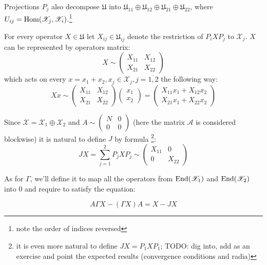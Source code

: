 \documentclass{article}
\begin{document}
Projections \( P_j \) also decompose \( \mathfrak U \) into
\( \mathfrak U_{11} \oplus \mathfrak U_{12} \oplus \mathfrak U_{21} \oplus \mathfrak U_{22} \),
where \( U_{ij} = \mathrm{Hom}({\mathscr X_j},{\mathscr X_i}) \).\footnote{note the order of indices reversed}

For every operator \( X\in\mathfrak U \)
let \( X_{ij} \in \mathfrak U_{ij} \) denote the restriction of \( P_i X P_j \) to \( \mathscr X_j \).
\( X \) can be represented by operators matrix:
\[X \sim \begin{pmatrix}
    X_{11} & X_{12} \\
    X_{21} & X_{22}
\end{pmatrix}\]
which acts on every \( x = x_1 + x_2, x_j\in\mathscr X_j,j=\overline{1,2} \) the following way:
\[
X x \sim
\begin{pmatrix}
    X_{11} & X_{12} \\
    X_{21} & X_{22}
\end{pmatrix}
\begin{pmatrix} x_1 \\ x_2 \end{pmatrix}
= \begin{pmatrix}
    X_{11} x_1 + X_{12} x_2 \\
    X_{21} x_1 + X_{22} x_2
\end{pmatrix}
\]

Since \( \mathscr X = \mathscr X_1 \oplus \mathscr X_2 \) and \( A \sim \begin{pmatrix} N & 0 \\ 0 & 0 \end{pmatrix} \)
(here the matrix \( \mathcal A \) is considered blockwise)
it is natural to define \( J \) by formula
    \footnote{it is even more natural to define \( JX=P_1XP_1 \);
    TODO: dig into, add as an exercise and point the expected results (convergence conditions and radia)}:
\[JX = \sum_{j=1}^2 P_j X P_j \sim \begin{pmatrix} X_{11} & 0 \\ 0 & X_{22} \end{pmatrix}\]

As for \( \Gamma \), we'll define it to map
all the operators from \( \mathrm{End}({\mathscr X_1}) \) and \( \mathrm{End}({\mathscr X_2}) \) into \( 0 \)
and require to satisfy the equation:

\begin{equation}
\label{eq:gammadef}
    A\Gamma X - (\Gamma X) A = X - JX
\end{equation}
\end{document}
